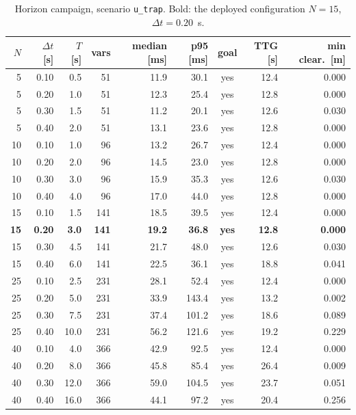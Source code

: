 \begin{table}[htbp]
  \centering
  \small
  \caption{Horizon campaign, scenario \texttt{u\_trap}. Bold: the deployed configuration $N=15$, $\Delta t=0.20$~s.}
  \label{res:tab:horizon:utrap}
  \begin{tabular}{rrrrrrcrr}
    \toprule
    $N$ & $\Delta t$ [s] & $T$ [s] & vars & median [ms] & p95 [ms] & goal & TTG [s] & min clear.\ [m] \\
    \midrule
    5 & 0.10 & 0.5 & 51 & 11.9 & 30.1 & yes & 12.4 & 0.000 \\
    5 & 0.20 & 1.0 & 51 & 12.3 & 25.4 & yes & 12.8 & 0.000 \\
    5 & 0.30 & 1.5 & 51 & 11.2 & 20.1 & yes & 12.6 & 0.030 \\
    5 & 0.40 & 2.0 & 51 & 13.1 & 23.6 & yes & 12.8 & 0.000 \\
    10 & 0.10 & 1.0 & 96 & 13.2 & 26.7 & yes & 12.4 & 0.000 \\
    10 & 0.20 & 2.0 & 96 & 14.5 & 23.0 & yes & 12.8 & 0.000 \\
    10 & 0.30 & 3.0 & 96 & 15.9 & 35.3 & yes & 12.6 & 0.030 \\
    10 & 0.40 & 4.0 & 96 & 17.0 & 44.0 & yes & 12.8 & 0.000 \\
    15 & 0.10 & 1.5 & 141 & 18.5 & 39.5 & yes & 12.4 & 0.000 \\
    \textbf{15} & \textbf{0.20} & \textbf{3.0} & \textbf{141} & \textbf{19.2} & \textbf{36.8} & \textbf{yes} & \textbf{12.8} & \textbf{0.000} \\
    15 & 0.30 & 4.5 & 141 & 21.7 & 48.0 & yes & 12.6 & 0.030 \\
    15 & 0.40 & 6.0 & 141 & 22.5 & 36.1 & yes & 18.8 & 0.041 \\
    25 & 0.10 & 2.5 & 231 & 28.1 & 52.4 & yes & 12.4 & 0.000 \\
    25 & 0.20 & 5.0 & 231 & 33.9 & 143.4 & yes & 13.2 & 0.002 \\
    25 & 0.30 & 7.5 & 231 & 37.4 & 101.2 & yes & 18.6 & 0.089 \\
    25 & 0.40 & 10.0 & 231 & 56.2 & 121.6 & yes & 19.2 & 0.229 \\
    40 & 0.10 & 4.0 & 366 & 42.9 & 92.5 & yes & 12.4 & 0.000 \\
    40 & 0.20 & 8.0 & 366 & 45.8 & 85.4 & yes & 26.4 & 0.009 \\
    40 & 0.30 & 12.0 & 366 & 59.0 & 104.5 & yes & 23.7 & 0.051 \\
    40 & 0.40 & 16.0 & 366 & 44.1 & 97.2 & yes & 20.4 & 0.256 \\
    \bottomrule
  \end{tabular}
\end{table}

